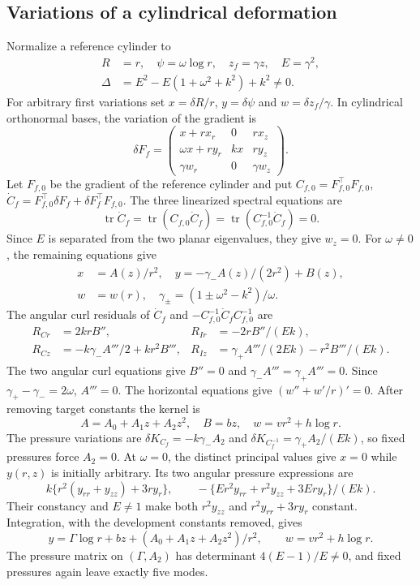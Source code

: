 \documentclass[11pt,a4paper]{article}
\numberwithin{equation}{section}
\theoremstyle{plain}
\theoremstyle{definition}
\theoremstyle{remark}
\begin{document}
\subsection{Variations of a cylindrical deformation}
\label{appiso-cylinder}
Normalize a reference cylinder to
\[
 \begin{aligned}
 R&=r,\quad\psi=\omega\log r,\quad z_f=\gamma z,\quad E=\gamma^2,\\
 \Delta&=E^2-E(1+\omega^2+k^2)+k^2\ne0.
 \end{aligned}
\]
For arbitrary first variations set $x=\delta R/r$,
$y=\delta\psi$ and $w=\delta z_f/\gamma$. In cylindrical orthonormal
bases, the variation of the gradient is
\[
 \delta F_f=\begin{pmatrix}
 x+rx_r&0&rx_z\\
 \omega x+ry_r&kx&ry_z\\
 \gamma w_r&0&\gamma w_z
 \end{pmatrix}.
\]
Let $F_{f,0}$ be the gradient of the reference cylinder and put
$C_{f,0}=F_{f,0}^{\top}F_{f,0}$, $\dot C_f=F_{f,0}^{\top}\delta F_f+\delta F_f^{\top}F_{f,0}$.
The three linearized spectral equations are
\[
 \operatorname{tr}\dot C_f=\operatorname{tr}(C_{f,0}\dot C_f)
                  =\operatorname{tr}(C_{f,0}^{-1}\dot C_f)=0.
\]
Since $E$ is separated from the two planar eigenvalues, they give
$w_z=0$. For $\omega\ne0$, the remaining equations give
\[
 \begin{aligned}
 x&=A(z)/r^2,\quad y=-\gamma_-A(z)/(2r^2)+B(z),\\
 w&=w(r),\quad\gamma_\pm=(1\pm\omega^2-k^2)/\omega.
 \end{aligned}
\]
The angular curl residuals of $\dot C_f$ and $-C_{f,0}^{-1}\dot C_f C_{f,0}^{-1}$ are
\begin{align*}
 R_{Cr}&=2krB'',& R_{Ir}&=-2rB''/(Ek),\\
 R_{Cz}&=-k\gamma_-A'''/2+kr^2B''',&
 R_{Iz}&=\gamma_+A'''/(2Ek)-r^2B'''/(Ek).
\end{align*}
The two angular curl equations give $B''=0$ and
$\gamma_-A'''=\gamma_+A'''=0$.  Since $\gamma_+-\gamma_-=2\omega$,
$A'''=0$.  The horizontal equations give $(w''+w'/r)'=0$.
After removing target constants the kernel is
\begin{equation}\label{iso:cylinder-linear}
 A=A_0+A_1z+A_2z^2,\quad B=bz,\quad w=vr^2+h\log r.
\end{equation}
The pressure variations are
$\delta K_{C_f}=-k\gamma_-A_2$ and
$\delta K_{C_f^{-1}}=\gamma_+A_2/(Ek)$, so fixed pressures force $A_2=0$.
At $\omega=0$, the distinct principal values give $x=0$ while $y(r,z)$
is initially arbitrary. Its two angular pressure expressions are
\[
 k\{r^2(y_{rr}+y_{zz})+3ry_r\},\qquad
 -\{Er^2y_{rr}+r^2y_{zz}+3Ery_r\}/(Ek).
\]
Their constancy and $E\ne1$ make both $r^2y_{zz}$ and
$r^2y_{rr}+3ry_r$ constant. Integration, with the development
constants removed, gives
\[
 y=\Gamma\log r+bz+(A_0+A_1z+A_2z^2)/r^2,\qquad
 w=vr^2+h\log r.
\]
The pressure matrix on $(\Gamma,A_2)$ has determinant $4(E-1)/E\ne0$,
and fixed pressures again leave exactly five modes.
\end{document}
